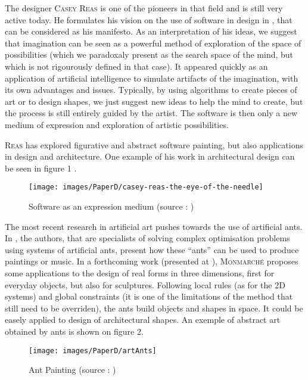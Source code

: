 \documentclass[english]{article}
\newcommand{\noun}[1]{\textsc{#1}}
\begin{document}
The designer \noun{Casey Reas} is one of the pioneers in that field
and is still very active today. He formulates his vision on the use
of software in design in \cite{reas2010form+}, that can be considered
as his manifesto. As an interpretation of his ideas, we suggest that
imagination can be seen as a powerful method of exploration of the
space of possibilities (which we paradoxaly present as the search
space of the mind, but which is not rigourously defined in that case).
It appeared quickly as an application of artificial intelligence
to simulate artifacts of the imagination, with its own advantages
and issues. Typically, by using algorithms to create pieces of art
or to design shapes, we just suggest new ideas to help the mind to
create, but the process is still entirely guided by the artist. The
software is then only a new medium of expression and exploration of
artistic possibilities.

\noun{Reas} has explored figurative and abstract software painting,
but also applications in design and architecture. One example of his
work in architectural design can be seen in figure 1 .

\begin{figure}


\texttt{[image: images/PaperD/casey-reas-the-eye-of-the-needle]}\caption{Software as an expression medium (source : \cite{reas2010form+})}


\end{figure}


\bigskip{}


The most recent research in artificial art pushes towards the use of artificial
ants. In \cite{monmarche2008artificial}, the authors, that are specialists
of solving complex optimisation problems using systems of artificial
ants, present how these ``ants'' can be used to produce paintings
or music. In a forthcoming work (presented at \cite{lectureAnts}),
\noun{Monmarché} proposes some applications to the design of real
forms in three dimensions, first for everyday objects, but also for
sculptures. Following local rules (as for the 2D systems) and global
constraints (it is one of the limitations of the method that still
need to be overriden), the ants build objects and shapes in space.
It could be easely applied to design of architectural shapes. An exemple
of abstract art obtained by ants is shown on figure 2.

\begin{figure}


\texttt{[image: images/PaperD/artAnts]}\caption{Ant Painting (source : \cite{monmarche2008artificial})}


\end{figure}
\end{document}
